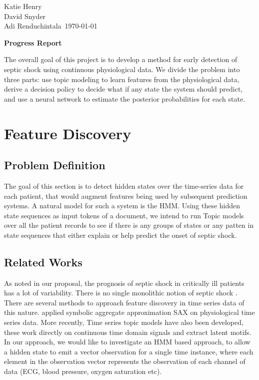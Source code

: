 \documentclass[12pt,solutions]{article}
\newcommand{\prof}{Katie Henry \\ David Snyder \\ Adi Renduchintala}
\newcommand{\topic}{MLCD Project}
\newlength{\toppush}
\newcommand{\htitle} 
{
    \noindent\vspace*{-\toppush}\newline\parbox{6.5in}
    {
        \vspace{-.85cm}
        \prof\hfill \ 
	 \today
	\vspace*{-.5ex}\newline
        \mbox{}\hrulefill\mbox{}
    }
    \vspace*{1ex}\mbox{}\newline
    \begin{center}{
        \large\bf{Progress Report} }\end{center}
}
\newcommand{\handout}
{
    \thispagestyle{empty}
    \markboth{\topic}{\topic}
    \pagestyle{myheadings}
    \htitle
}
\begin{document}
\handout

\setlength{\parindent}{0pt}

The overall goal of this project is to develop a method for early detection of septic shock using continuous physiological data. We divide the problem into three parts: use topic modeling to learn features from the physiological data, derive a decision policy to decide what if any state the system should predict, and use a neural network to estimate the posterior probabilities for each state.

\setcounter{section}{0}
\section{Feature Discovery}
\subsection{Problem Definition}
The goal of this section is to detect hidden states over the time-series data for each patient, that would augment features being used by subsequent prediction systems. A natural model for such a system is the HMM. Using these hidden state sequences as input tokens of a document, we intend to run Topic models over all the patient records to see if there is any groups of states or any patten in state sequences that either explain or help predict the onset of septic shock.
\subsection{Related Works}
As noted in our proposal, the prognosis of septic shock in critically ill patients has a lot of variability. There is no single monolithic notion of septic shock \cite{Shavdia2007} . There are several methods to approach feature discovery in time series data of this nature. \cite{Esbroeck2012hrt}  applied symbolic aggregate approximation SAX \cite{Lin2003sax} on physiological time series data. More recently, Time series topic models have also been developed, \cite{SariaThesis2011} these work directly on continuous time domain signals and extract latent motifs. In our approach, we would like to investigate an HMM based approach, to allow a hidden state to emit a vector observation for a single time instance, where each element in the observation vector represents the observation of each channel of data (ECG, blood pressure, oxygen saturation etc).
\end{document}
